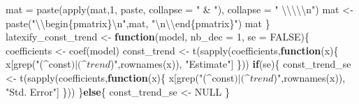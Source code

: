 \documentclass[
  10pt,
]{article}
\newenvironment{Shaded}{\begin{snugshade}}{\end{snugshade}}
\newcommand{\AttributeTok}[1]{\textcolor[rgb]{0.77,0.63,0.00}{#1}}
\newcommand{\ConstantTok}[1]{\textcolor[rgb]{0.00,0.00,0.00}{#1}}
\newcommand{\ControlFlowTok}[1]{\textcolor[rgb]{0.13,0.29,0.53}{\textbf{#1}}}
\newcommand{\DecValTok}[1]{\textcolor[rgb]{0.00,0.00,0.81}{#1}}
\newcommand{\FunctionTok}[1]{\textcolor[rgb]{0.00,0.00,0.00}{#1}}
\newcommand{\NormalTok}[1]{#1}
\newcommand{\OtherTok}[1]{\textcolor[rgb]{0.56,0.35,0.01}{#1}}
\newcommand{\SpecialCharTok}[1]{\textcolor[rgb]{0.00,0.00,0.00}{#1}}
\newcommand{\StringTok}[1]{\textcolor[rgb]{0.31,0.60,0.02}{#1}}
\begin{document}
\begin{Shaded}
\begin{Highlighting}[]
\NormalTok{    mat }\OtherTok{=} \FunctionTok{paste}\NormalTok{(}\FunctionTok{apply}\NormalTok{(mat,}\DecValTok{1}\NormalTok{, paste, }\AttributeTok{collapse =} \StringTok{" \& "}\NormalTok{), }\AttributeTok{collapse =} \StringTok{" }\SpecialCharTok{\textbackslash{}\textbackslash{}\textbackslash{}\textbackslash{}\textbackslash{}n}\StringTok{"}\NormalTok{)}
\NormalTok{    mat }\OtherTok{\textless{}{-}} \FunctionTok{paste}\NormalTok{(}\StringTok{"}\SpecialCharTok{\textbackslash{}\textbackslash{}}\StringTok{begin\{pmatrix\}}\SpecialCharTok{\textbackslash{}n}\StringTok{"}\NormalTok{,mat,}
                 \StringTok{"}\SpecialCharTok{\textbackslash{}n\textbackslash{}\textbackslash{}}\StringTok{end\{pmatrix\}"}\NormalTok{)}
\NormalTok{    mat}
\NormalTok{\}}
\NormalTok{latexify\_const\_trend }\OtherTok{\textless{}{-}} \ControlFlowTok{function}\NormalTok{(model, }\AttributeTok{nb\_dec =} \DecValTok{1}\NormalTok{, }\AttributeTok{se =} \ConstantTok{FALSE}\NormalTok{)\{}
\NormalTok{    coefficients }\OtherTok{\textless{}{-}} \FunctionTok{coef}\NormalTok{(model)}
\NormalTok{    const\_trend }\OtherTok{\textless{}{-}} \FunctionTok{t}\NormalTok{(}\FunctionTok{sapply}\NormalTok{(coefficients,}\ControlFlowTok{function}\NormalTok{(x)\{}
\NormalTok{        x[}\FunctionTok{grep}\NormalTok{(}\StringTok{"(\^{}const$)|(\^{}trend$)"}\NormalTok{,}\FunctionTok{rownames}\NormalTok{(x)), }\StringTok{"Estimate"}\NormalTok{]}
\NormalTok{    \})) }
    \ControlFlowTok{if}\NormalTok{(se)\{}
\NormalTok{        const\_trend\_se }\OtherTok{\textless{}{-}} \FunctionTok{t}\NormalTok{(}\FunctionTok{sapply}\NormalTok{(coefficients,}\ControlFlowTok{function}\NormalTok{(x)\{}
\NormalTok{            x[}\FunctionTok{grep}\NormalTok{(}\StringTok{"(\^{}const$)|(\^{}trend$)"}\NormalTok{,}\FunctionTok{rownames}\NormalTok{(x)), }\StringTok{"Std. Error"}\NormalTok{]}
\NormalTok{        \}))  }
\NormalTok{    \}}\ControlFlowTok{else}\NormalTok{\{}
\NormalTok{        const\_trend\_se }\OtherTok{\textless{}{-}} \ConstantTok{NULL}
\NormalTok{    \}}
    

\end{Highlighting}
\end{Shaded}
\end{document}
